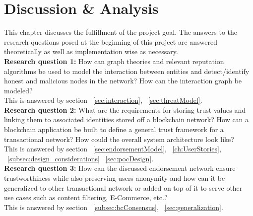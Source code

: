 \chapter{Discussion \& Analysis} \label{ch:discussion}
This chapter discusses the fulfillment of the project goal. The answers to the
research questions posed at the beginning of this project are answered
theoretically as well as implementation wise as necessary.\\

\textbf{Research question 1: }How can graph theories and relevant reputation
algorithms be used to model the interaction between entities and
detect/identify honest and malicious nodes in the network? How can the
interaction graph be modeled? \\

This is answered by section ~\ref{sec:interaction},
~\ref{sec:threatModel}.\\

\textbf{Research question 2: }What are the requirements for storing trust values
and linking them to associated identities stored off a blockchain network? How
can a blockchain application be built to define a general trust framework for a
transactional network? How could the overall system architecture look like?\\

This is answered by section ~\ref{sec:endorsementModel},
~\ref{ch:UserStories}, ~\ref{subsec:design_considerations}
~\ref{sec:pocDesign}. \\

\textbf{Research question 3: }How can the discussed endorsement network ensure
trustworthiness while also preserving users anonymity and how can it be
generalized to other transactional network or added on top of it to serve other
use cases such as content filtering, E-Commerce, etc.? \\

This is answered by section ~\ref{subsec:bcConsensus},
~\ref{sec:generalization}.\\

